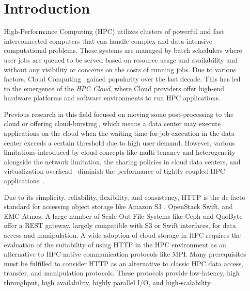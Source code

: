\documentclass[runningheads]{llncs}
\begin{document}
\section {Introduction}
High-Performance Computing (HPC) utilizes clusters of powerful and fast interconnected computers that can handle complex and data-intensive computational problems. These systems are managed by batch schedulers \cite{ma2004dynamic} where user jobs are queued to be served based on resource usage and availability and without any visibility or concerns on the costs of running jobs.
Due to various factors, Cloud Computing \,\cite {mell2011nist} gained popularity over the last decade. This has led to the emergence of the \textit{HPC Cloud}, where Cloud providers offer high-end hardware platforms and software environments to run HPC applications.

Previous research in this field focused on moving some post-processing to the cloud or offering cloud-bursting\,\cite{lafayetteexploring}, which means a data center may execute applications on the cloud when the waiting time for job execution in the data center exceeds a certain threshold due to high user demand. However, various limitations introduced by cloud concepts like multi-tenancy and heterogeneity \,\cite{gupta2013improving} alongside the network limitation, the sharing policies in cloud data centers, and virtualization overhead \,\cite{performanceAnalysisHPCinCloud} diminish the performance of tightly coupled HPC applications \,\cite{evangelinos2008cloud}.

Due to its simplicity, reliability, flexibility, and consistency, HTTP is the de facto standard for accessing object storage like Amazon S3 \cite{awsS3Url}, OpenStack Swift, and EMC Atmos. A large number of Scale-Out-File Systems like Ceph and QuoByte offer a REST gateway, largely compatible with S3 or Swift interfaces, for data access and manipulation. A wide adoption of cloud storage in HPC requires the evaluation of  the suitability of using HTTP in the HPC environment as an alternative to HPC-native communication protocols like MPI.
Many prerequisites must be fulfilled to consider HTTP as an alternative to classic HPC data access, transfer, and manipulation protocols. These protocols provide low-latency, high throughput, high availability, highly parallel I/O, and high-scalability \cite{Devresse}. 
\end{document}
